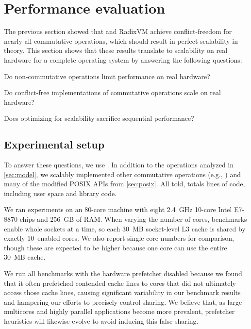 \section{Performance evaluation}
\label{sec:eval}

The previous section showed that \fs and RadixVM achieve conflict-freedom
for nearly all commutative operations, which should result
in perfect scalability in
theory.  This section shows that these results translate to scalability on
real hardware for a complete operating system by answering the following
questions:

\begin{CompactItemize}

\item Do non-commutative operations limit performance on real
  hardware?

\item Do conflict-free implementations of commutative operations scale
  on real hardware?

\item Does optimizing for scalability sacrifice sequential performance?

\end{CompactItemize}


\subsection{Experimental setup}
\label{sec:topic:ben}

To answer these questions, we use \sys.
In addition to the operations analyzed in \cref{sec:model}, we scalably
implemented
other commutative operations (e.g., )
and many of the modified POSIX APIs from
\cref{sec:posix}.
%
All told, \sys
totals  lines of code, including user
space and library code.

We ran experiments on an 80-core machine with eight 2.4~GHz 10-core
Intel E7-8870 chips and 256~GB of RAM.  When varying the number of
cores, benchmarks enable whole sockets at a time, so each 30~MB
socket-level L3 cache is shared by exactly 10~enabled cores.
We also report single-core numbers for
comparison, though these are expected to be higher because one
core can use the entire 30~MB cache.

We run all benchmarks with the hardware prefetcher disabled because we
found that it often prefetched contended cache lines to cores that did
not ultimately access those cache lines, causing significant
variability in our benchmark results and hampering our efforts to
precisely control sharing.  We believe that, as large multicores and
highly parallel applications become more prevalent, prefetcher
heuristics will likewise evolve to avoid inducing this false sharing.

